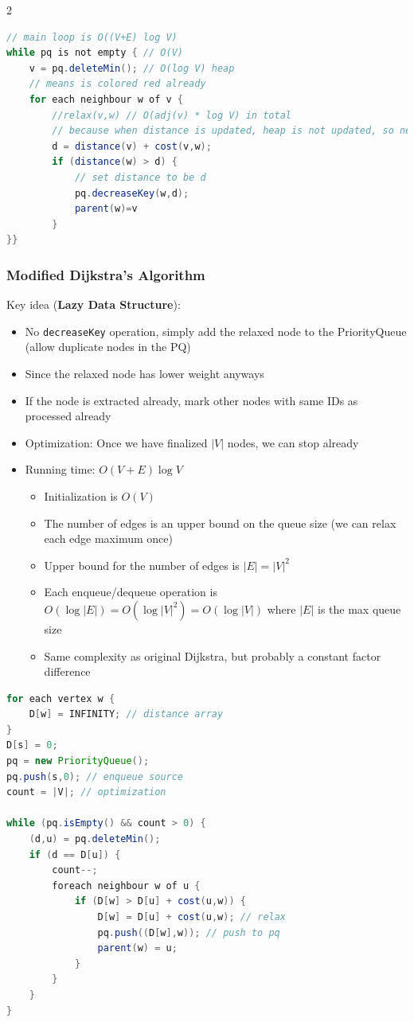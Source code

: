 \documentclass{article}
\begin{document}
\begin{multicols}{2}
\begin{lstlisting}[language=Java]
// main loop is O((V+E) log V)
while pq is not empty { // O(V)
	v = pq.deleteMin(); // O(log V) heap
	// means is colored red already
	for each neighbour w of v {
		//relax(v,w) // O(adj(v) * log V) in total
		// because when distance is updated, heap is not updated, so need to update manually using heapify() or heapRebuild
		d = distance(v) + cost(v,w);
		if (distance(w) > d) {
			// set distance to be d
			pq.decreaseKey(w,d);
			parent(w)=v
		}
}}
\end{lstlisting}

\subsubsection{Modified Dijkstra's Algorithm}
Key idea (\textbf{Lazy Data Structure}):
\begin{itemize}
	\item No \texttt{decreaseKey} operation, simply add the relaxed node to the PriorityQueue (allow duplicate nodes in the PQ)
	\item Since the relaxed node has lower weight anyways
	\item If the node is extracted already, mark other nodes with same IDs as processed already
	\item Optimization: Once we have finalized $|V|$ nodes, we can stop already
	\item Running time: $O(V+E)\log{V}$
	\begin{itemize}
		\item Initialization is $O(V)$
		\item The number of edges is an upper bound on the queue size (we can relax each edge maximum once)
		\item Upper bound for the number of edges is $|E|= |V|^2$
		\item Each enqueue/dequeue operation is $O(\log{|E|}) = O(\log{|V|^2}) = O(\log{|V|})$ where $|E|$ is the max queue size
		\item Same complexity as original Dijkstra, but probably a constant factor difference
	\end{itemize}
\end{itemize}
\begin{lstlisting}[language=Java]
for each vertex w {
	D[w] = INFINITY; // distance array
}
D[s] = 0;
pq = new PriorityQueue();
pq.push(s,0); // enqueue source
count = |V|; // optimization

while (pq.isEmpty() && count > 0) {
	(d,u) = pq.deleteMin();
	if (d == D[u]) {
		count--;
		foreach neighbour w of u {
			if (D[w] > D[u] + cost(u,w)) {
				D[w] = D[u] + cost(u,w); // relax
				pq.push((D[w],w)); // push to pq
				parent(w) = u;
			}
		}
	}
}
\end{lstlisting}


\end{multicols}
\end{document}
